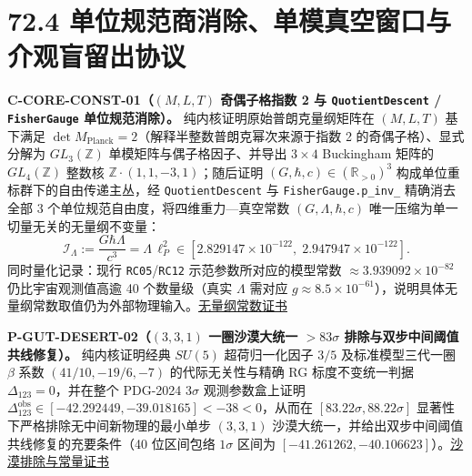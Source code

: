 \documentclass[
  11pt,
  oneside]{book}
\begin{document}
\section{72.4 单位规范商消除、单模真空窗口与介观盲留出协议}

\protect\hypertarget{c-core-const-01}{}{}

\textbf{C-CORE-CONST-01（\((M,L,T)\) 奇偶子格指数 2 与
\texttt{Quotient\allowbreak Descent} / \texttt{Fisher\allowbreak Gauge} 单位规范消除）。}
纯内核证明原始普朗克量纲矩阵在 \((M,L,T)\) 基下满足
\(\det M_{\mathrm{Planck}} = 2\)（解释半整数普朗克幂次来源于指数 2
的奇偶子格）、显式分解为 \(GL_3(\mathbb{Z})\)
单模矩阵与偶子格因子、并导出 \(3\times 4\) Buckingham 矩阵的
\(GL_4(\mathbb{Z})\) 整数核 \(\mathbb{Z}\cdot(1,1,-3,1)\)；随后证明
\((G,\hbar,c) \in (\mathbb{R}_{>0})^3\)
构成单位重标群下的自由传递主丛，经 \texttt{Quotient\allowbreak Descent} 与
\texttt{Fisher\allowbreak Gauge.\allowbreak p\_\allowbreak inv\_} 精确消去全部 3
个单位规范自由度，将四维重力---真空常数 \((G,\Lambda,\hbar,c)\)
唯一压缩为单一切量无关的无量纲不变量： \[
\mathcal{I}_\Lambda := \frac{G\hbar\Lambda}{c^3} = \Lambda\,\ell_P^2 \in [2.829147\times 10^{-122},\; 2.947947\times 10^{-122}].
\] 同时量化记录：现行 \texttt{RC05}/\texttt{RC12}
示范参数所对应的模型常数 \(\approx 3.939092\times 10^{-82}\)
仍比宇宙观测值高逾 40 个数量级（真实 \(\Lambda\) 需对应
\(g \approx 8.5\times 10^{-61}\)），说明具体无量纲常数取值仍为外部物理输入。\href{../../unification/core_dimensionless_constants/certificate.json}{无量纲常数证书}

\protect\hypertarget{p-gut-desert-02}{}{}

\textbf{P-GUT-DESERT-02（\((3,3,1)\) 一圈沙漠大统一 \(>83\sigma\)
排除与双步中间阈值共线修复）。} 纯内核证明经典 \(SU(5)\) 超荷归一化因子
\(3/5\) 及标准模型三代一圈 \(\beta\) 系数 \((41/10, -19/6, -7)\)
的代际无关性与精确 RG 标度不变统一判据 \(\Delta_{123} = 0\)，并在整个
PDG-2024 \(3\sigma\) 观测参数盒上证明
\(\Delta_{123}^{\mathrm{obs}} \in [-42.292449, -39.018165] < -38 < 0\)，从而在
\([83.22\sigma, 88.22\sigma]\) 显著性下严格排除无中间新物理的最小单步
\((3,3,1)\) 沙漠大统一，并给出双步中间阈值共线修复的充要条件（40
位区间包络 \(1\sigma\) 区间为
\([-41.261262, -40.106623]\)）。\href{../../unification/core_dimensionless_constants/certificate.json}{沙漠排除与常量证书}

\protect\hypertarget{p-unimodular-lambda-09}{}{}
\end{document}

